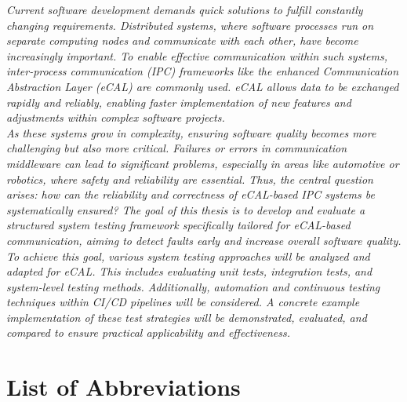\documentclass[a4paper,12pt,singlespacing]{article}
\begin{document}
\pagebreak
\vspace*{2cm}
 \textit{Current software development demands quick solutions to fulfill constantly changing requirements. Distributed systems, where software processes run on separate computing nodes and communicate with each other, have become increasingly important. To enable effective communication within such systems, inter-process communication (IPC) frameworks like the enhanced Communication Abstraction Layer (eCAL) are commonly used. eCAL allows data to be exchanged rapidly and reliably, enabling faster implementation of new features and adjustments within complex software projects. } \\ 

 \textit{As these systems grow in complexity, ensuring software quality becomes more challenging but also more critical. Failures or errors in communication middleware can lead to significant problems, especially in areas like automotive or robotics, where safety and reliability are essential. Thus, the central question arises: how can the reliability and correctness of eCAL-based IPC systems be systematically ensured? The goal of this thesis is to develop and evaluate a structured system testing framework specifically tailored for eCAL-based communication, aiming to detect faults early and increase overall software quality. } \\ 

 \textit{To achieve this goal, various system testing approaches will be analyzed and adapted for eCAL. This includes evaluating unit tests, integration tests, and system-level testing methods. Additionally, automation and continuous testing techniques within CI/CD pipelines will be considered. A concrete example implementation of these test strategies will be demonstrated, evaluated, and compared to ensure practical applicability and effectiveness. }

\pagebreak

\tableofcontents
\pagebreak

\listoffigures
{}
\pagebreak

\lstlistoflistings
{}
\pagebreak

\section*{List of Abbreviations}
\end{document}
